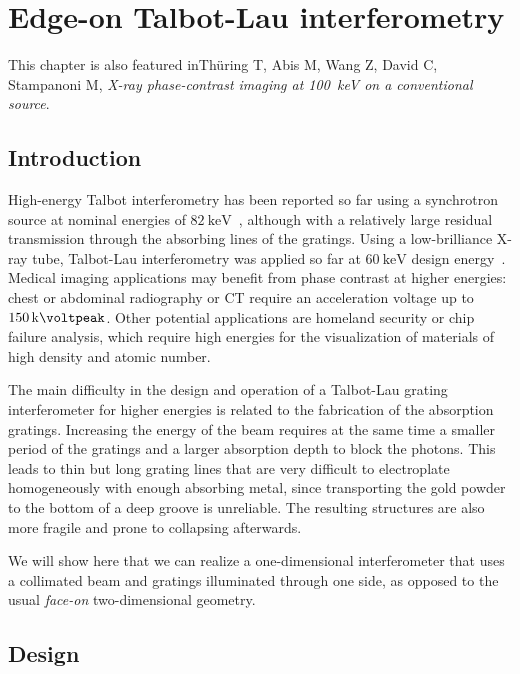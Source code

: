 \chapter{Edge-on Talbot-Lau interferometry}\label{ch:edgeon} %
This chapter is also featured in\cn Th\"uring T, Abis M, Wang Z, David C,
Stampanoni M, \emph{X-ray phase-contrast imaging at \SI{100}{\kilo\eV} on a
conventional source}.

\section{Introduction}
High-energy Talbot interferometry has been reported so far using a
synchrotron source at nominal energies of
$\SI{82}{\kilo\electronvolt}$~\cite{Willner2013}, although with a relatively
large residual transmission through the absorbing lines of the gratings.
Using a low-brilliance X-ray tube, Talbot-Lau interferometry was applied so
far at $\SI{60}{\kilo\electronvolt}$ design energy~\cite{Donath2009a}.
Medical imaging applications may benefit from phase contrast at higher
energies: chest or abdominal radiography or \ac{CT} require an acceleration
voltage up to $\SI{150}{\kilo\voltpeak}$. Other potential
applications are homeland security or chip failure analysis, which require
high energies for the visualization of materials of high density and atomic
number.

The main difficulty in the design and operation of a Talbot-Lau grating
interferometer for higher energies is related to the fabrication of the
absorption gratings. Increasing the energy of the beam requires at the same
time a smaller period of the gratings and a larger absorption depth to block
the photons. This leads to thin but long grating lines that are very
difficult to electroplate homogeneously with enough absorbing metal, since
transporting the gold powder to the bottom of a deep groove is unreliable\cn.
The resulting structures are also more fragile and prone to collapsing
afterwards\cn.

We will show here that we can realize a one-dimensional interferometer that
uses a collimated beam and gratings illuminated through one side, as opposed
to the usual \emph{face-on} two-dimensional geometry.

\section{Design}
